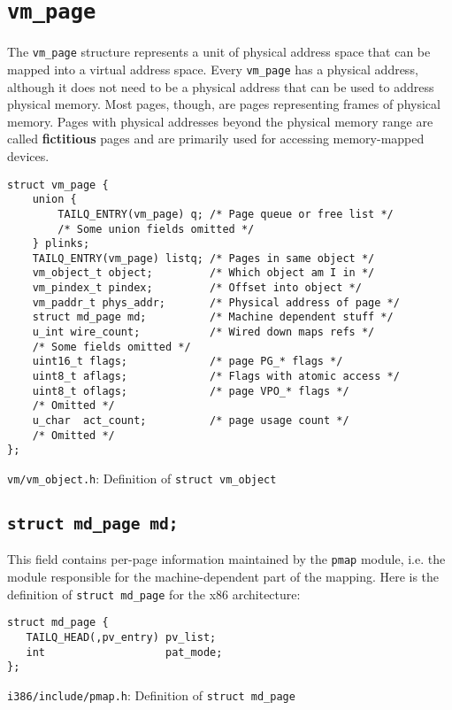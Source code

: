\documentclass[shortabstract, english]{iithesis}
\begin{document}
\section{\texttt{vm_page}}

The \texttt{vm_page} structure represents a unit of physical address
space that can be mapped into a virtual address space. Every
\texttt{vm_page} has a physical address, although it does not need to be
a physical address that can be used to address physical memory. Most pages,
though, are pages representing frames of physical memory. Pages with physical
addresses beyond the physical memory range are called \textbf{fictitious} pages
and are primarily used for accessing memory-mapped devices.


\begin{listing}[H]
\begin{verbatim}
struct vm_page {
    union {
        TAILQ_ENTRY(vm_page) q; /* Page queue or free list */
        /* Some union fields omitted */
    } plinks;
    TAILQ_ENTRY(vm_page) listq; /* Pages in same object */
    vm_object_t object;         /* Which object am I in */
    vm_pindex_t pindex;         /* Offset into object */
    vm_paddr_t phys_addr;       /* Physical address of page */
    struct md_page md;          /* Machine dependent stuff */
    u_int wire_count;           /* Wired down maps refs */
    /* Some fields omitted */
    uint16_t flags;             /* page PG_* flags */
    uint8_t aflags;             /* Flags with atomic access */
    uint8_t oflags;             /* page VPO_* flags */
    /* Omitted */
    u_char  act_count;          /* page usage count */
    /* Omitted */
};
\end{verbatim}
\caption{\texttt{vm/vm\_object.h}: Definition of \texttt{struct vm_object}}
\end{listing}

\subsection*{\texttt{struct md_page md;}}
This field contains per-page information maintained by the \texttt{pmap}
module, i.e. the module responsible for the machine-dependent part of the mapping.
Here is the definition of \texttt{struct md_page} for the x86
architecture:

\begin{listing}[H]
\begin{verbatim}
struct md_page {
   TAILQ_HEAD(,pv_entry) pv_list;
   int                   pat_mode;
};
\end{verbatim}
\caption{\texttt{i386/include/pmap.h}: Definition of \texttt{struct md_page}}
\end{listing}
\end{document}
